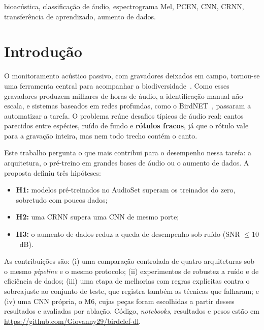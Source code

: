 \documentclass[conference]{IEEEtran}
\begin{document}
\begin{IEEEkeywords}
bioacústica, classificação de áudio, espectrograma Mel, PCEN, CNN, CRNN, transferência de aprendizado, aumento de dados.
\end{IEEEkeywords}

\section{Introdução}

O monitoramento acústico passivo, com gravadores deixados em campo, tornou-se uma ferramenta central para acompanhar a biodiversidade~\cite{stowell2022}. Como esses gravadores produzem milhares de horas de áudio, a identificação manual não escala, e sistemas baseados em redes profundas, como o BirdNET~\cite{kahl2021birdnet}, passaram a automatizar a tarefa. O problema reúne desafios típicos de áudio real: cantos parecidos entre espécies, ruído de fundo e \textbf{rótulos fracos}, já que o rótulo vale para a gravação inteira, mas nem todo trecho contém o canto.

Este trabalho pergunta o que mais contribui para o desempenho nessa tarefa: a arquitetura, o pré-treino em grandes bases de áudio ou o aumento de dados. A proposta definiu três hipóteses:

\begin{itemize}
  \item \textbf{H1:} modelos pré-treinados no AudioSet superam os treinados do zero, sobretudo com poucos dados;
  \item \textbf{H2:} uma CRNN supera uma CNN de mesmo porte;
  \item \textbf{H3:} o aumento de dados reduz a queda de desempenho sob ruído (SNR $\leq 10$~dB).
\end{itemize}

As contribuições são: (i) uma comparação controlada de quatro arquiteturas sob o mesmo \textit{pipeline} e o mesmo protocolo; (ii) experimentos de robustez a ruído e de eficiência de dados; (iii) uma etapa de melhorias com regras explícitas contra o sobreajuste ao conjunto de teste, que registra também as técnicas que falharam; e (iv) uma CNN própria, o M6, cujas peças foram escolhidas a partir desses resultados e avaliadas por ablação. Código, \textit{notebooks}, resultados e pesos estão em \url{https://github.com/Giovanny29/birdclef-dl}.

\end{document}
